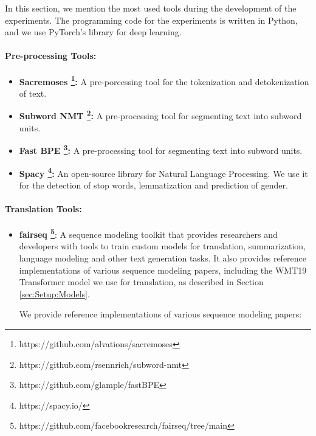 In this section, we mention the most used tools during the development of the experiments. The programming code for the experiments is written in Python, and we use PyTorch's library for deep learning.

\paragraph{Pre-processing Tools:}
\begin{itemize}
    \item \textbf{Sacremoses \footnote{https://github.com/alvations/sacremoses}:} A pre-porcessing tool for the tokenization and detokenization of text.
    \item \textbf{Subword NMT \footnote{https://github.com/rsennrich/subword-nmt}:} A pre-processing tool for segmenting text into subword units. %
    \item \textbf{Fast BPE \footnote{https://github.com/glample/fastBPE}:} A pre-processing tool for segmenting text into subword units. %
    \item \textbf{Spacy \footnote{https://spacy.io/}:} An open-source library for Natural Language Processing. We use it for the detection of stop words, lemmatization and prediction of gender.
\end{itemize}

\paragraph{Translation Tools:}
\begin{itemize}
    \item \textbf{fairseq \footnote{https://github.com/facebookresearch/fairseq/tree/main}}: A sequence modeling toolkit that provides researchers and developers with tools to train custom models for translation, summarization, language modeling and other text generation tasks. It also provides reference implementations of various sequence modeling papers, including the WMT19 Transformer model \parencite{WMT19} we use for translation, as described in Section \ref{sec:Setup:Models}.

We provide reference implementations of various sequence modeling papers:
\end{itemize}

